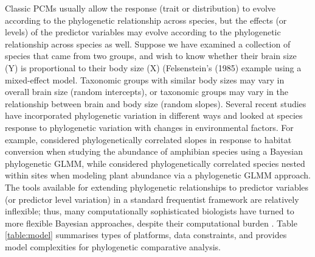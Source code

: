 \documentclass[12pt]{article}
\begin{document}
% 

Classic PCMs usually allow the response (trait or distribution) to evolve according to the phylogenetic relationship across species, but the effects (or levels) of the predictor variables may evolve according to the phylogenetic relationship across species as well.
Suppose we have examined a collection of species that came from two groups, and wish to know whether their brain size (Y) is proportional to their body size (X) (Felsenstein's (1985) example using a mixed-effect model. 
Taxonomic groups with similar body sizes may vary in overall brain size (random intercepts), or taxonomic groups may vary in the relationship between brain and body size (random slopes). 
Several recent studies have incorporated phylogenetic variation in different ways and looked at species response to phylogenetic variation with changes in environmental factors.
For example, \cite{nowakowski2018phylogenetic} considered phylogenetically correlated slopes in response to habitat conversion when studying the abundance of amphibian species using a Bayesian phylogenetic GLMM, while \cite{li2017canfun} considered phylogenetically correlated species nested within sites when modeling plant abundance via a phylogenetic GLMM approach. 
The tools available for extending phylogenetic relationships to predictor variables (or predictor level variation) in a standard frequentist framework are relatively inflexible; thus, many computationally sophisticated biologists have turned to more flexible Bayesian approaches, despite their computational burden \citep{hadfield2010mcmc, burkner2018brms}.
Table \ref{table:model} summarises types of platforms, data constraints, and provides model complexities for phylogenetic comparative analysis.
\end{document}
